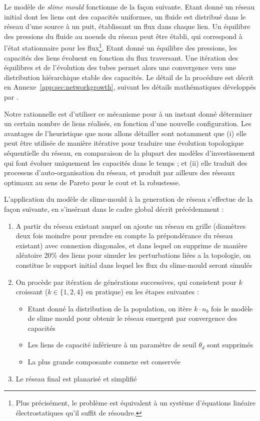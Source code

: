 Le modèle de \emph{slime mould} fonctionne de la façon suivante. Etant donné un réseau initial dont les liens ont des capacités uniformes, un fluide est distribué dans le réseau d'une source à un puit, établissant un flux dans chaque lien. Un équilibre des pressions du fluide au noeuds du réseau peut être établi, qui correspond à l'état stationnaire pour les flux\footnote{Plus précisément, le problème est équivalent à un système d'équations linéaire électrostatiques qu'il suffit de résoudre.}. Etant donné un équilibre des pressions, les capacités des liens évoluent en fonction du flux traversant. Une itération des équilibres et de l'évolution des tubes permet alors une convergence vers une distribution hiérarchique stable des capacités. Le détail de la procédure est décrit en Annexe~\ref{app:sec:networkgrowth}, suivant les détails mathématiques développés par \cite{tero2007mathematical}.


Notre rationnelle est d'utiliser ce mécanisme pour à un instant donné déterminer un certain nombre de liens réalisés, en fonction d'une nouvelle configuration. Les avantages de l'heuristique que nous allons détailler sont notamment que (i) elle peut être utilisée de manière itérative pour traduire une évolution topologique séquentielle du réseau, en comparaison de la plupart des modèles d'investissement qui font évoluer uniquement les capacités dans le temps ; et (ii) elle traduit des processus d'auto-organisation du réseau, et produit par ailleurs des réseaux optimaux au sens de Pareto pour le cout et la robustesse.


L'application du modèle de slime-mould à la generation de réseau s'effectue de la façon suivante, en s'insérant dans le cadre global décrit précédemment :

\begin{enumerate}
	\item A partir du réseau existant auquel on ajoute un réseau en grille (diamètres deux fois moindre pour prendre en compte la prépondérance du réseau existant) avec connexion diagonales, et dans lequel on supprime de manière aléatoire 20\% des liens pour simuler les perturbations liées a la topologie, on constitue le support initial dans lequel les flux du slime-mould seront simulés 
	\item On procède par itération de générations successives, qui consistent pour $k$ croissant ($k\in \{ 1,2,4 \}$ en pratique) en les étapes suivantes :
	\begin{itemize}
		\item Etant donné la distribution de la population, on itère $k\cdot n_b$ fois le modèle de slime mould pour obtenir le réseau emergent par convergence des capacités
		\item Les liens de capacité inférieure à un paramètre de seuil $\theta_d$ sont supprimés
		\item La plus grande composante connexe est conservée
	\end{itemize}
	\item Le réseau final est planarisé et simplifié
\end{enumerate}



